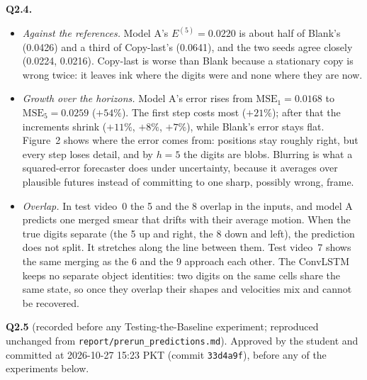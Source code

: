 \textbf{Q2.4.}
\begin{itemize}
\item \emph{Against the references.} Model A's $E^{(5)}=0.0220$ is about half of Blank's (0.0426) and a third
of Copy-last's (0.0641), and the two seeds agree closely (0.0224, 0.0216). Copy-last is worse than Blank because
a stationary copy is wrong twice: it leaves ink where the digits were and none where they are now.
\item \emph{Growth over the horizons.} Model A's error rises from $\mathrm{MSE}_1=0.0168$ to
$\mathrm{MSE}_5=0.0259$ ($+54\%$). The first step costs most ($+21\%$); after that the increments shrink ($+11\%$, $+8\%$,
$+7\%$), while Blank's error stays flat. Figure~2 shows where the error comes from: positions stay roughly right, but every
step loses detail, and by $h=5$ the digits are blobs. Blurring is what a squared-error forecaster does under
uncertainty, because it averages over plausible futures instead of committing to one sharp, possibly wrong, frame.
\item \emph{Overlap.} In test video~0 the 5 and the 8 overlap in the inputs, and model A predicts one merged
smear that drifts with their average motion. When the true digits separate (the 5 up and right, the 8 down and
left), the prediction does not split. It stretches along the line between them. Test video~7 shows the same
merging as the 6 and the 9 approach each other. The ConvLSTM keeps no separate object identities: two digits on
the same cells share the same state, so once they overlap their shapes and velocities mix and cannot be recovered.
\end{itemize}

\textbf{Q2.5} (recorded before any Testing-the-Baseline experiment; reproduced unchanged from
\texttt{report/prerun\_predictions.md}).
Approved by the student and committed at 2026-10-27 15:23 PKT (commit \texttt{33d4a9f}), before any of the
experiments below.

